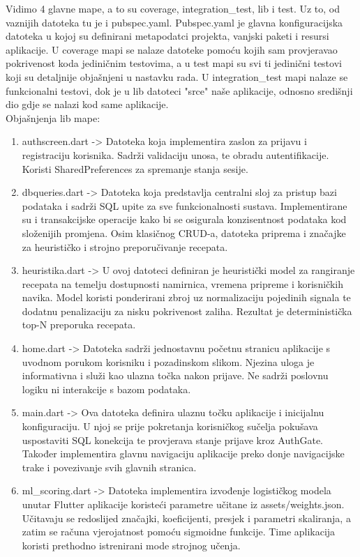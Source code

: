 \documentclass[diplomskirad]{fer}
\begin{document}
Vidimo 4 glavne mape, a to su coverage, integration\_test, lib i test. Uz to, od vaznijih datoteka tu je i pubspec.yaml. Pubspec.yaml je glavna konfiguracijska datoteka u kojoj su definirani metapodatci projekta, vanjski paketi i resursi aplikacije. U coverage mapi se nalaze datoteke pomoću kojih sam provjeravao pokrivenost koda jediničnim testovima, a u test mapi su svi ti jedinični testovi koji su detaljnije objašnjeni u nastavku rada. U integration\_test mapi nalaze se funkcionalni testovi, dok je u lib datoteci "srce" naše aplikacije, odnosno središnji dio gdje se nalazi kod same aplikacije.
\\
Objašnjenja lib mape:
\begin{enumerate}
    \item authscreen.dart -> Datoteka koja implementira zaslon za prijavu i registraciju korisnika. Sadrži validaciju unosa, te obradu autentifikacije. Koristi SharedPreferences za spremanje stanja sesije.
    \item dbqueries.dart -> Datoteka koja predstavlja centralni sloj za pristup bazi podataka i sadrži SQL upite za sve funkcionalnosti sustava. Implementirane su i transakcijske operacije kako bi se osigurala konzisentnost podataka kod složenijih promjena. Osim klasičnog CRUD-a, datoteka priprema i značajke za heurističko i strojno preporučivanje recepata.
    \item heuristika.dart -> U ovoj datoteci definiran je heuristički model za rangiranje recepata na temelju dostupnosti namirnica, vremena pripreme i korisničkih navika. Model koristi ponderirani zbroj uz normalizaciju pojedinih signala te dodatnu penalizaciju za nisku pokrivenost zaliha. Rezultat je deterministička top-N preporuka recepata.
    \item home.dart -> Datoteka sadrži jednostavnu početnu stranicu aplikacije s uvodnom porukom korisniku i pozadinskom slikom. Njezina uloga je informativna i služi kao ulazna točka nakon prijave. Ne sadrži poslovnu logiku ni interakcije s bazom podataka.
    \item main.dart  -> Ova datoteka definira ulaznu točku aplikacije i inicijalnu konfiguraciju. U njoj se prije pokretanja korisničkog sučelja pokušava uspostaviti SQL konekcija te provjerava stanje prijave kroz AuthGate. Također implementira glavnu navigaciju aplikacije preko donje navigacijske trake i povezivanje svih glavnih stranica.
    \item ml\_scoring.dart -> Datoteka implementira izvođenje logističkog modela unutar Flutter aplikacije koristeći parametre učitane iz assets/weights.json. Učitavaju se redoslijed značajki, koeficijenti, presjek i parametri skaliranja, a zatim se računa vjerojatnost pomoću sigmoidne funkcije. Time aplikacija koristi prethodno istrenirani mode strojnog učenja.

\end{enumerate}
\end{document}
